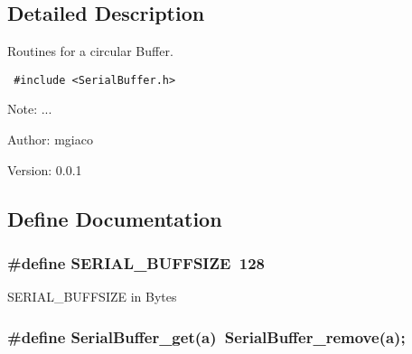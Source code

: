 \subsection{Detailed Description}
Routines for a circular Buffer. 



\begin{Code}\begin{verbatim} #include <SerialBuffer.h> 
\end{verbatim}
\end{Code}

 \begin{Desc}
\item[Note:]... \end{Desc}
\begin{Desc}
\item[Author:]mgiaco \end{Desc}
\begin{Desc}
\item[Version:]0.0.1 \end{Desc}


\subsection{Define Documentation}
\hypertarget{group__serialbuffer_gd47283ecaa82d1fd076f405ba3172fc1}{
\subsubsection[{SERIAL\_\-BUFFSIZE}]{\setlength{\rightskip}{0pt plus 5cm}\#define SERIAL\_\-BUFFSIZE~128}}
\label{group__serialbuffer_gd47283ecaa82d1fd076f405ba3172fc1}


SERIAL\_\-BUFFSIZE in Bytes \hypertarget{group__serialbuffer_g557d78acaa759e408254896ba66cbb66}{
\subsubsection[{SerialBuffer\_\-get}]{\setlength{\rightskip}{0pt plus 5cm}\#define SerialBuffer\_\-get(a)~SerialBuffer\_\-remove(a);}}
\label{group__serialbuffer_g557d78acaa759e408254896ba66cbb66}


